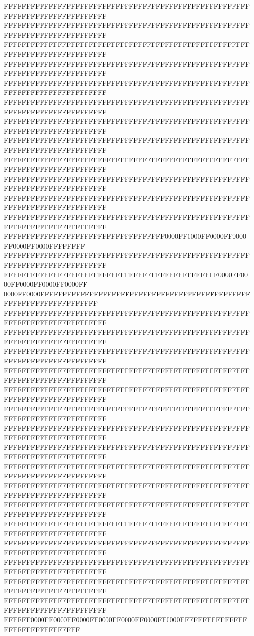 FFFFFFFFFFFFFFFFFFFFFFFFFFFFFFFFFFFFFFFFFFFFFFFFFFFFFFFFFFFFFFFFFFFFFFFFFFFFFF
FFFFFFFFFFFFFFFFFFFFFFFFFFFFFFFFFFFFFFFFFFFFFFFFFFFFFFFFFFFFFFFFFFFFFFFFFFFFFF
FFFFFFFFFFFFFFFFFFFFFFFFFFFFFFFFFFFFFFFFFFFFFFFFFFFFFFFFFFFFFFFFFFFFFFFFFFFFFF
FFFFFFFFFFFFFFFFFFFFFFFFFFFFFFFFFFFFFFFFFFFFFFFFFFFFFFFFFFFFFFFFFFFFFFFFFFFFFF
FFFFFFFFFFFFFFFFFFFFFFFFFFFFFFFFFFFFFFFFFFFFFFFFFFFFFFFFFFFFFFFFFFFFFFFFFFFFFF
FFFFFFFFFFFFFFFFFFFFFFFFFFFFFFFFFFFFFFFFFFFFFFFFFFFFFFFFFFFFFFFFFFFFFFFFFFFFFF
FFFFFFFFFFFFFFFFFFFFFFFFFFFFFFFFFFFFFFFFFFFFFFFFFFFFFFFFFFFFFFFFFFFFFFFFFFFFFF
FFFFFFFFFFFFFFFFFFFFFFFFFFFFFFFFFFFFFFFFFFFFFFFFFFFFFFFFFFFFFFFFFFFFFFFFFFFFFF
FFFFFFFFFFFFFFFFFFFFFFFFFFFFFFFFFFFFFFFFFFFFFFFFFFFFFFFFFFFFFFFFFFFFFFFFFFFFFF
FFFFFFFFFFFFFFFFFFFFFFFFFFFFFFFFFFFFFFFFFFFFFFFFFFFFFFFFFFFFFFFFFFFFFFFFFFFFFF
FFFFFFFFFFFFFFFFFFFFFFFFFFFFFFFFFFFFFFFFFFFFFFFFFFFFFFFFFFFFFFFFFFFFFFFFFFFFFF
FFFFFFFFFFFFFFFFFFFFFFFFFFFFFFFFFFFFFFFFFFFFFFFFFFFFFFFFFFFFFFFFFFFFFFFFFFFFFF
FFFFFFFFFFFFFFFFFFFFFFFFFFFFFFFFFFFF0000FF0000FF0000FF0000FF0000FF0000FFFFFFFF
FFFFFFFFFFFFFFFFFFFFFFFFFFFFFFFFFFFFFFFFFFFFFFFFFFFFFFFFFFFFFFFFFFFFFFFFFFFFFF
FFFFFFFFFFFFFFFFFFFFFFFFFFFFFFFFFFFFFFFFFFFFFFFF0000FF0000FF0000FF0000FF0000FF
0000FF0000FFFFFFFFFFFFFFFFFFFFFFFFFFFFFFFFFFFFFFFFFFFFFFFFFFFFFFFFFFFFFFFFFFFF
FFFFFFFFFFFFFFFFFFFFFFFFFFFFFFFFFFFFFFFFFFFFFFFFFFFFFFFFFFFFFFFFFFFFFFFFFFFFFF
FFFFFFFFFFFFFFFFFFFFFFFFFFFFFFFFFFFFFFFFFFFFFFFFFFFFFFFFFFFFFFFFFFFFFFFFFFFFFF
FFFFFFFFFFFFFFFFFFFFFFFFFFFFFFFFFFFFFFFFFFFFFFFFFFFFFFFFFFFFFFFFFFFFFFFFFFFFFF
FFFFFFFFFFFFFFFFFFFFFFFFFFFFFFFFFFFFFFFFFFFFFFFFFFFFFFFFFFFFFFFFFFFFFFFFFFFFFF
FFFFFFFFFFFFFFFFFFFFFFFFFFFFFFFFFFFFFFFFFFFFFFFFFFFFFFFFFFFFFFFFFFFFFFFFFFFFFF
FFFFFFFFFFFFFFFFFFFFFFFFFFFFFFFFFFFFFFFFFFFFFFFFFFFFFFFFFFFFFFFFFFFFFFFFFFFFFF
FFFFFFFFFFFFFFFFFFFFFFFFFFFFFFFFFFFFFFFFFFFFFFFFFFFFFFFFFFFFFFFFFFFFFFFFFFFFFF
FFFFFFFFFFFFFFFFFFFFFFFFFFFFFFFFFFFFFFFFFFFFFFFFFFFFFFFFFFFFFFFFFFFFFFFFFFFFFF
FFFFFFFFFFFFFFFFFFFFFFFFFFFFFFFFFFFFFFFFFFFFFFFFFFFFFFFFFFFFFFFFFFFFFFFFFFFFFF
FFFFFFFFFFFFFFFFFFFFFFFFFFFFFFFFFFFFFFFFFFFFFFFFFFFFFFFFFFFFFFFFFFFFFFFFFFFFFF
FFFFFFFFFFFFFFFFFFFFFFFFFFFFFFFFFFFFFFFFFFFFFFFFFFFFFFFFFFFFFFFFFFFFFFFFFFFFFF
FFFFFFFFFFFFFFFFFFFFFFFFFFFFFFFFFFFFFFFFFFFFFFFFFFFFFFFFFFFFFFFFFFFFFFFFFFFFFF
FFFFFFFFFFFFFFFFFFFFFFFFFFFFFFFFFFFFFFFFFFFFFFFFFFFFFFFFFFFFFFFFFFFFFFFFFFFFFF
FFFFFFFFFFFFFFFFFFFFFFFFFFFFFFFFFFFFFFFFFFFFFFFFFFFFFFFFFFFFFFFFFFFFFFFFFFFFFF
FFFFFFFFFFFFFFFFFFFFFFFFFFFFFFFFFFFFFFFFFFFFFFFFFFFFFFFFFFFFFFFFFFFFFFFFFFFFFF
FFFFFFFFFFFFFFFFFFFFFFFFFFFFFFFFFFFFFFFFFFFFFFFFFFFFFFFFFFFFFFFFFFFFFFFFFFFFFF
FFFFFF0000FF0000FF0000FF0000FF0000FF0000FF0000FFFFFFFFFFFFFFFFFFFFFFFFFFFFFFFF
